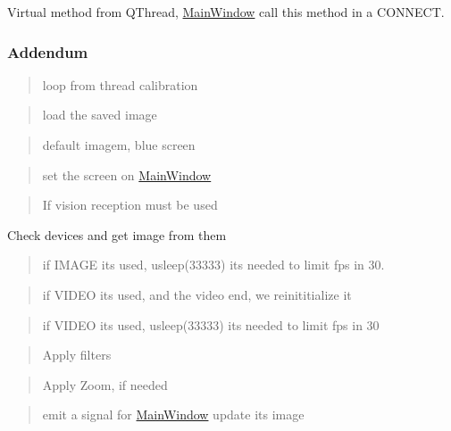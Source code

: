 Virtual method from Q\+Thread, \hyperlink{classMainWindow}{Main\+Window} call this method in a C\+O\+N\+N\+E\+CT. 

\subsubsection*{Addendum }

\begin{quote}
loop from thread calibration \end{quote}
\begin{quote}
load the saved image \end{quote}


\begin{quote}
default imagem, blue screen \end{quote}


\begin{quote}
set the screen on \hyperlink{classMainWindow}{Main\+Window} \end{quote}


\begin{quote}
If vision reception must be used \end{quote}


Check devices and get image from them

\begin{quote}
if I\+M\+A\+GE it\textquotesingle{}s used, usleep(33333) its needed to limit fps in 30. \end{quote}


\begin{quote}
if V\+I\+D\+EO it\textquotesingle{}s used, and the video end, we reinititialize it \end{quote}


\begin{quote}
if V\+I\+D\+EO it\textquotesingle{}s used, usleep(33333) it\textquotesingle{}s needed to limit fps in 30 \end{quote}


\begin{quote}
Apply filters \end{quote}


\begin{quote}
Apply Zoom, if needed \end{quote}


\begin{quote}
emit a signal for \hyperlink{classMainWindow}{Main\+Window} update its image \end{quote}


